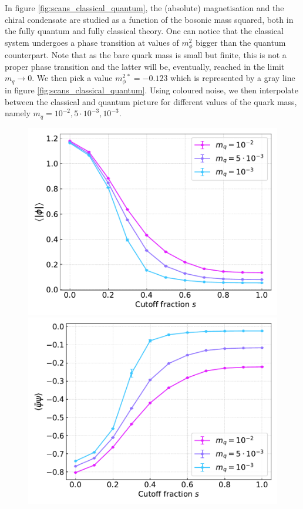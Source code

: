 In figure \ref{fig:scans_classical_quantum}, the (absolute) magnetisation and the chiral condensate are studied as a function of the bosonic mass squared, both in the fully quantum and fully classical theory. One can notice that the classical system undergoes a phase transition at values of $m_\phi^2$ bigger than the quantum counterpart. Note that as the bare quark mass is small but finite, this is not a proper phase transition and the latter will be, eventually, reached in the limit $m_q \to 0$. We then pick a value $m_\phi^{2 \, *} = -0.123$ which is represented by a gray line in figure \ref{fig:scans_classical_quantum}.
Using coloured noise, we then interpolate between the classical and quantum picture for different values of the quark mass, namely $m_q = 10^{-2}, 5 \cdot 10^{-3}, 10^{-3}$.
\begin{figure}[h]
\centering
\begin{minipage}{0.45\textwidth}	
	\includegraphics[scale=0.48]{figures/chiral_PT/magnetisation.pdf}
\end{minipage}
\hfill
\begin{minipage}{0.45\textwidth}	
	\includegraphics[scale=0.48]{figures/chiral_PT/condensate.pdf}

\end{minipage}
\end{figure}
